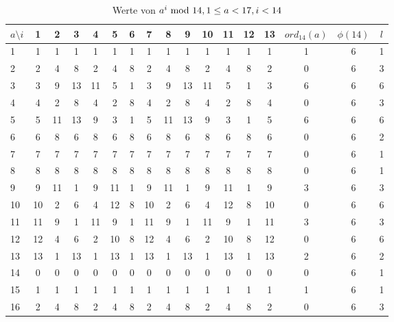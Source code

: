 \begin{refsegment}
\begin{table}[ht]
\begin{center}
\begin{tabular}{|l||c|c|c|c|c|c|c|c|c|c|c|c|c||c|c|c|}
\hline
$a \setminus i$ & 1 & 2 & 3 & 4 & 5 & 6 & 7 & 8 & 9 & 10 & 11 & 12 & 13 & $ord_{14}(a)$       & $\phi(14)$ & $l$\\
\hline
\hline
1 & 1 & 1 & 1 & 1 & 1 & 1 & 1 & 1 & 1 & 1 & 1 & 1 & 1 & 1 & 6 & 1\\
\hline
2 & 2 & 4 & 8 & 2 & 4 & 8 & 2 & 4 & 8 & 2 & 4 & 8 & 2 & 0 & 6 & 3\\
\hline
3 & 3 & 9 & 13 & 11 & 5 & 1 & 3 & 9 & 13 & 11 & 5 & 1 & 3 & 6 & 6 & 6\\
\hline
4 & 4 & 2 & 8 & 4 & 2 & 8 & 4 & 2 & 8 & 4 & 2 & 8 & 4 & 0 & 6 & 3\\
\hline
5 & 5 & 11 & 13 & 9 & 3 & 1 & 5 & 11 & 13 & 9 & 3 & 1 & 5 & 6 & 6 & 6\\
\hline
6 & 6 & 8 & 6 & 8 & 6 & 8 & 6 & 8 & 6 & 8 & 6 & 8 & 6 & 0 & 6 & 2\\
\hline
7 & 7 & 7 & 7 & 7 & 7 & 7 & 7 & 7 & 7 & 7 & 7 & 7 & 7 & 0 & 6 & 1\\
\hline
8 & 8 & 8 & 8 & 8 & 8 & 8 & 8 & 8 & 8 & 8 & 8 & 8 & 8 & 0 & 6 & 1\\
\hline
9 & 9 & 11 & 1 & 9 & 11 & 1 & 9 & 11 & 1 & 9 & 11 & 1 & 9 & 3 & 6 & 3\\
\hline
10 & 10 & 2 & 6 & 4 & 12 & 8 & 10 & 2 & 6 & 4 & 12 & 8 & 10 & 0 & 6 & 6\\
\hline
11 & 11 & 9 & 1 & 11 & 9 & 1 & 11 & 9 & 1 & 11 & 9 & 1 & 11 & 3 & 6 & 3\\
\hline
12 & 12 & 4 & 6 & 2 & 10 & 8 & 12 & 4 & 6 & 2 & 10 & 8 & 12 & 0 & 6 & 6\\
\hline
13 & 13 & 1 & 13 & 1 & 13 & 1 & 13 & 1 & 13 & 1 & 13 & 1 & 13 & 2 & 6 & 2\\
\hline
14 & 0 & 0 & 0 & 0 & 0 & 0 & 0 & 0 & 0 & 0 & 0 & 0 & 0 & 0 & 6 & 1\\
\hdashline
\hdashline
15 & 1 & 1 & 1 & 1 & 1 & 1 & 1 & 1 & 1 & 1 & 1 & 1 & 1 & 1 & 6 & 1\\
\hline
16 & 2 & 4 & 8 & 2 & 4 & 8 & 2 & 4 & 8 & 2 & 4 & 8 & 2 & 0 & 6 & 3\\
\hline
\end{tabular}
\end{center}
\caption{Werte von $a^i{\rm ~mod~}14, 1\leq a<17, i<14$}
\label{expmod14}
\end{table}



\end{refsegment}
